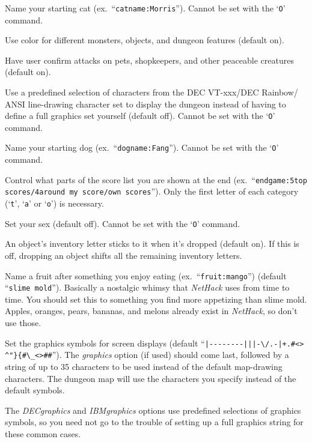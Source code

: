 \blist{}
\item[\ib{catname}]
Name your starting cat (ex.\ ``{\tt catname:Morris}'').
Cannot be set with the `{\tt O}' command.
\item[\ib{color}]
Use color for different monsters, objects, and dungeon features (default on).
\item[\ib{confirm}]
Have user confirm attacks on pets, shopkeepers, and other
peaceable creatures (default on).
\item[\ib{DECgraphics}]
Use a predefined selection of characters from the DEC VT-xxx/DEC Rainbow/
ANSI line-drawing character set to display the dungeon instead of having
to define a full graphics set yourself (default off).
Cannot be set with the `{\tt O}' command.
\item[\ib{dogname}]
Name your starting dog (ex.\ ``{\tt dogname:Fang}'').
Cannot be set with the `{\tt O}' command.
\item[\ib{endgame}]
Control what parts of the score list you are shown at the end (ex.\
``{\tt endgame:5top scores/4around my score/own scores}'').  Only the first
letter of each category (`{\tt t}', `{\tt a}' or `{\tt o}') is necessary.
\item[\ib{female}]
Set your sex (default off). Cannot be set with the `{\tt O}' command.
\item[\ib{fixinvlet}]
An object's inventory letter sticks to it when it's dropped (default on).
If this is off, dropping an object shifts all the remaining inventory letters.
\item[\ib{fruit}]
Name a fruit after something you enjoy eating (ex.\ ``{\tt fruit:mango}'')
(default ``{\tt slime mold}''). Basically a nostalgic whimsy that
{\it NetHack\/} uses from time to time.  You should set this to something you
find more appetizing than slime mold.  Apples, oranges, pears, bananas, and
melons already exist in {\it NetHack}, so don't use those.
\item[\ib{graphics}]
Set the graphics symbols for screen displays (default
``\verb&|--------|||-\/.-|+.#<>& \verb&^"}{#\_<>##&''). The
{\it graphics\/}
option (if used) should come last, followed by a string of up to 35
characters to be used instead of the default map-drawing characters.
The dungeon map will use the characters you specify instead of the
default symbols.

The
{\it DECgraphics}
and
{\it IBMgraphics}
options use predefined selections of graphics symbols, so you need not
go to the trouble of setting up a full graphics string for these common
cases.

